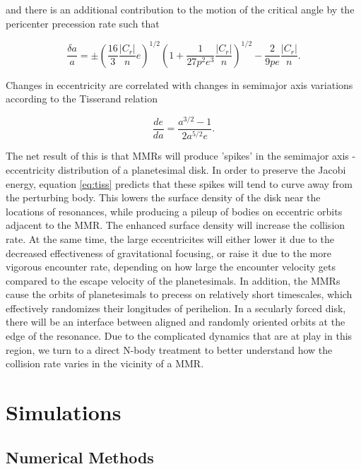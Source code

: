 \documentclass[onecolumn]{aastex63}
\begin{document}
\noindent and there is an additional contribution to the motion of the critical angle by the pericenter precession rate such that

\begin{equation}\label{eq:res_fo}
	\frac{\delta a}{a} = \pm \left(\frac{16}{3} \frac{\left| C_{r} \right|}{n} e \right)^{1/2} \left(  1 + \frac{1}{27 p^2 e^3} \frac{\left| C_{r} \right|}{n} 
	\right)^{1/2} - \frac{2}{9 p e}  \frac{\left| C_{r} \right|}{n}.
\end{equation}

Changes in eccentricity are correlated with changes in semimajor axis variations according to the Tisserand relation

\begin{equation}\label{eq:tiss}
	\frac{de}{da} = \frac{a^{3/2} - 1}{2 a^{5/2} e}.
\end{equation}

The net result of this is that MMRs will produce 'spikes' in the semimajor axis - eccentricity distribution of a planetesimal disk. In order to 
preserve the Jacobi energy, equation \ref{eq:tiss} predicts that these spikes will tend to curve away from the perturbing body. This lowers the 
surface density of the disk near the locations of resonances, while producing a pileup of bodies on eccentric orbits adjacent to the MMR. The 
enhanced surface density will increase the collision rate. At the same time, the large eccentricites will either lower it due to the decreased 
effectiveness of gravitational focusing, or raise it due to the more vigorous encounter rate, depending on how large the encounter velocity gets 
compared to the escape velocity of the planetesimals. In addition, the MMRs cause the orbits of planetesimals to precess on relatively short 
timescales, which effectively randomizes their longitudes of perihelion. In a secularly forced disk, there will be an interface between aligned 
and randomly oriented orbits at the edge of the resonance. Due to the complicated dynamics that are at play in this region, we turn to a direct 
N-body treatment to better understand how the collision rate varies in the vicinity of a MMR.

\section{Simulations} \label{sec:sims}

\subsection{Numerical Methods}\label{sec:methods}
\end{document}
